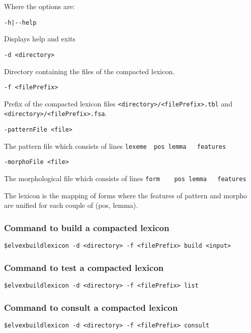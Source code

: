 \documentclass[11pt]{article}
\begin{document}
Where the options are:

\begin{description}
\item \verb#-h|--help#

Displays help and exits

\item \verb#-d <directory>#

  Directory containing the files of the compacted lexicon.

\item \verb#-f <filePrefix>#

  Prefix of the compacted lexicon files
  \verb#<directory>/<filePrefix>.tbl# and
  \verb#<directory>/<filePrefix>.fsa#.
  
\item \verb#-patternFile <file>#

  The pattern file which consists of lines
  \verb#lexeme	pos	lemma	features#

\item \verb#-morphoFile <file>#
  
  The morphological file which consists of lines
  \verb#form	pos	lemma	features#

\end{description}

The lexicon is the mapping of forms where the features of pattern and
morpho are unified for each couple of (pos, lemma).

\subsubsection*{Command to build a compacted lexicon}

\begin{description}
\item \verb#$elvexbuildlexicon -d <directory> -f <filePrefix> build <input># 
\end{description}

\subsubsection*{Command to test a compacted lexicon}

\begin{description}
\item \verb#$elvexbuildlexicon -d <directory> -f <filePrefix> list# 

\subsubsection*{Command to consult a compacted lexicon}

\item \verb#$elvexbuildlexicon -d <directory> -f <filePrefix> consult# 

\end{description}
\end{document}
